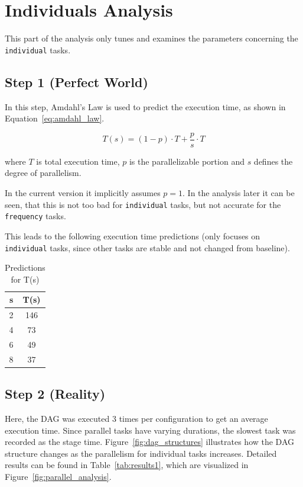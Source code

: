 \documentclass[a4paper, 12pt]{article}
\begin{document}
	\section*{Individuals Analysis}
	This part of the analysis only tunes and examines the parameters concerning the \texttt{individual} tasks.
	
	\subsection*{Step 1 (Perfect World)}
	In this step, Amdahl's Law is used to predict the execution time, as shown in Equation~\ref{eq:amdahl_law}.
	
	\begin{equation}
		T(s) = (1- p) \cdot T + \frac{p}{s} \cdot T
		\label{eq:amdahl_law}
	\end{equation}
	
	where $T$ is total execution time, $p$ is the parallelizable portion and $s$ defines the degree of parallelism.
	
	In the current version it implicitly assumes $p = 1$. In the analysis later it can be seen, that this is not too bad for \texttt{individual} tasks, but not accurate for the \texttt{frequency} tasks.
	
	This leads to the following execution time predictions (only focuses on \texttt{individual} tasks, since other tasks are stable and not changed from baseline).
	
	\begin{table}[h!]
		\centering
		\vspace{0.2cm} %
		\begin{tabular}{cc}
			\toprule
			\textbf{s} & \textbf{T(s)} \\
			\midrule
			2 & 146 \\
			4 & 73 \\
			6 & 49 \\
			8 & 37\\
			\bottomrule
		\end{tabular}
		\caption{Predictions for T(s)}
		\label{tab:predictions}
	\end{table}
	
	
	\subsection*{Step 2 (Reality)}
	Here, the DAG was executed 3 times per configuration to get an average execution time. Since parallel tasks have varying durations, the slowest task was recorded as the stage time. Figure~\ref{fig:dag_structures} illustrates how the DAG structure changes as the parallelism for individual tasks increases. Detailed results can be found in Table~\ref{tab:results1}, which are visualized in Figure~\ref{fig:parallel_analysis}.
	
\end{document}
